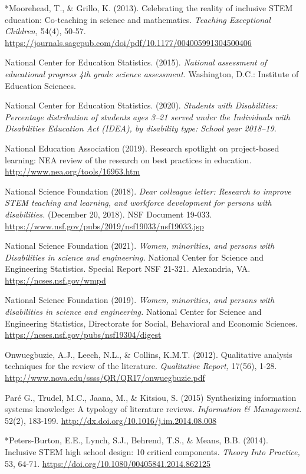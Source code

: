 \documentclass[11.5pt]{sig-alternate}
\begin{document}
*Moorehead, T., \& Grillo, K. (2013). Celebrating the reality of inclusive STEM education: Co-teaching in science and mathematics. \textit{Teaching Exceptional Children,} 54(4), 50-57. \url{https://journals.sagepub.com/doi/pdf/10.1177/004005991304500406}

National Center for Education Statistics. (2015). \textit{National assessment of educational progress 4th grade science assessment.} Washington, D.C.: Institute of Education Sciences.

National Center for Education Statistics. (2020). \textit{Students with Disabilities: Percentage distribution of students ages 3–21 served under the Individuals with Disabilities Education Act (IDEA), by disability type: School year 2018–19.}

National Education Association (2019). Research spotlight on project-based learning: NEA review of the research on best practices in education. \url{http://www.nea.org/tools/16963.htm}

National Science Foundation (2018). \textit{Dear colleague letter: Research to improve STEM teaching and learning, and workforce development for persons with disabilities.} (December 20, 2018). NSF Document 19-033. \url{https://www.nsf.gov/pubs/2019/nsf19033/nsf19033.jsp}

National Science Foundation (2021). \textit{Women, minorities, and persons with Disabilities in science and engineering.} National Center for Science and Engineering Statistics. Special Report NSF 21-321. Alexandria, VA. \url{https://ncses.nsf.gov/wmpd}

National Science Foundation (2019). \textit{Women, minorities, and persons with disabilities in science and engineering.} National Center for Science and Engineering Statistics, Directorate for Social, Behavioral and Economic Sciences. \url{https://ncses.nsf.gov/pubs/nsf19304/digest}

Onwuegbuzie, A.J., Leech, N.L., \& Collins, K.M.T. (2012). Qualitative analysis techniques for the review of the literature. \textit{Qualitative Report,} 17(56), 1-28. \url{http://www.nova.edu/ssss/QR/QR17/onwuegbuzie.pdf}

Paré G., Trudel, M.C., Jaana, M., \& Kitsiou, S. (2015) Synthesizing information systems knowledge: A typology of literature reviews. \textit{Information \& Management.} 52(2), 183-199. \url{http://dx.doi.org/10.1016/j.im.2014.08.008}

*Peters-Burton, E.E., Lynch, S.J., Behrend, T.S., \& Means, B.B. (2014). Inclusive STEM high school design: 10 critical components. \textit{Theory Into Practice,} 53, 64-71. \url{https://doi.org/10.1080/00405841.2014.862125}
\end{document}
